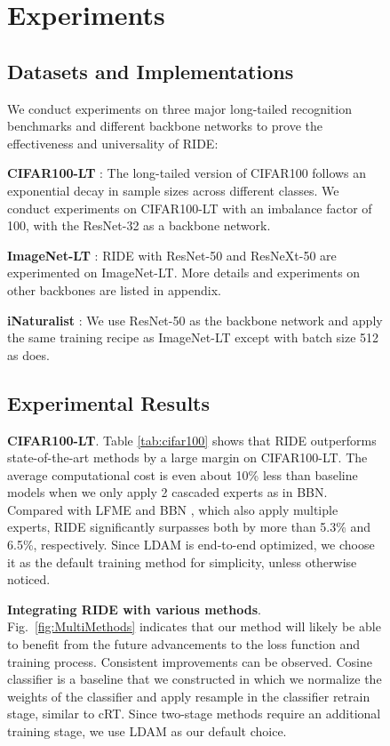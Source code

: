 \documentclass[dvipsnames]{article}
\def\fig#1{Fig.~\ref{fig:#1}}
\begin{document}
{\begin{figure}[#1]
\section{Experiments}
\label{experiments}

\subsection{Datasets and Implementations}

We conduct experiments on three major long-tailed recognition benchmarks and different backbone networks to prove the effectiveness and universality of RIDE:

{\bf{CIFAR100-LT}} \citep{cao2019learning}: The long-tailed version of CIFAR100 follows an exponential decay in sample sizes across different classes. We conduct experiments on CIFAR100-LT with an imbalance factor of 100, with the ResNet-32 \citep{he2016deep} as a backbone network. 

{\bf{ImageNet-LT}} \citep{liu2019large}: RIDE with ResNet-50 and ResNeXt-50 \citep{xie2017aggregated} are experimented on ImageNet-LT. More details and experiments on other backbones are listed in appendix.

{\bf{iNaturalist}} \citep{van2018inaturalist}: We use ResNet-50 as the backbone network and apply the same training recipe as ImageNet-LT except with batch size 512 as  \cite{kang2019decoupling} does.


\subsection{Experimental Results}

{\bf{CIFAR100-LT}}. Table \ref{tab:cifar100} shows that RIDE outperforms state-of-the-art methods by a large margin on CIFAR100-LT. The average computational cost is even about 10\% less than baseline models when we only apply 2 cascaded experts as in BBN. Compared with LFME \citep{xiang2020learning} and BBN \citep{zhou2020bbn}, which also apply multiple experts, RIDE significantly surpasses both by more than 5.3\% and 6.5\%, respectively. Since LDAM is end-to-end optimized, we choose it as the default training method for simplicity, unless otherwise noticed.


{\bf{Integrating RIDE with various methods}}. \fig{MultiMethods} indicates that our method will likely be able to benefit from the future advancements to the loss function and training process. Consistent improvements can be observed. Cosine classifier is a baseline that we constructed in which we normalize the weights of the classifier and apply resample in the classifier retrain stage, similar to cRT. 
Since two-stage methods require an additional training stage, we use LDAM as our default choice.


\end{figure}}
\end{document}

